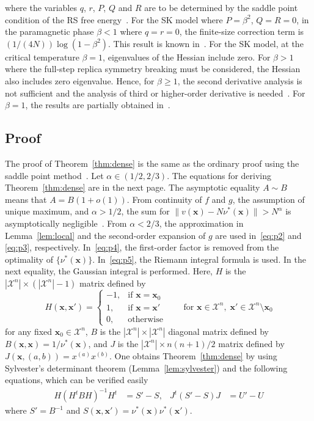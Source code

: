 \documentclass[conference,twocolumns]{IEEEtran}
\theoremstyle{plain}
\begin{document}
where the variables $q$, $r$, $P$, $Q$ and $R$ are to be determined by the saddle point condition of the RS free energy~\cite{mezard2009ipa}.
For the SK model where $P=\beta^2$, $Q=R=0$, in the paramagnetic phase $\beta<1$ where $q=r=0$, the finite-size correction term is
$(1/(4N))\log\left(1-\beta^2\right)$.
This result is known in~\cite{parisi1993critical}.
For the SK model, at the critical temperature $\beta=1$, eigenvalues of the Hessian include zero.
For $\beta > 1$ where the full-step replica symmetry breaking must be considered, the Hessian also includes zero eigenvalue. 
Hence, for $\beta\ge 1$, the second derivative analysis is not sufficient and the analysis of third or higher-order derivative is needed~\cite{flajolet2009analytic}.
For $\beta= 1$, the results are partially obtained in~\cite{parisi1993critical}.

\subsection{Proof}
The proof of Theorem~\ref{thm:dense} is the same as the ordinary proof using the saddle point method~\cite{flajolet2009analytic}.
Let $\alpha\in(1/2,2/3)$.
The equations for deriving Theorem~\ref{thm:dense} are in the next page.
The asymptotic equality $A\sim B$ means that $A=B(1+o(1))$.
From continuity of $f$ and $g$, the assumption of unique maximum, and $\alpha>1/2$, the sum for $\|v(\bm{x})-N\nu^*(\bm{x})\|>N^\alpha$
is asymptotically negligible~\cite{flajolet2009analytic}.
From $\alpha<2/3$, the approximation in Lemma~\ref{lem:local} and
the second-order expansion of $g$ are used
in~\eqref{eq:p2} and \eqref{eq:p3}, respectively.
In~\eqref{eq:p4}, the first-order factor is removed from the optimality of $\{\nu^*(\bm{x})\}$.
In~\eqref{eq:p5}, the Riemann integral formula is used.
In the next equality, the Gaussian integral is performed.
Here, $H$ is the $|\mathcal{X}^n|\times(|\mathcal{X}^n|-1)$ matrix defined by
\begin{equation*}
H(\bm{x},\bm{x}')=\begin{cases}
-1,& \text{if } \bm{x}=\bm{x}_0\\
1,& \text{if } \bm{x}=\bm{x}'\\
0,& \text{otherwise}
\end{cases}
\hspace{2em} \text{for } \bm{x}\in\mathcal{X}^n,\; \bm{x}'\in\mathcal{X}^n\setminus \bm{x}_0
\end{equation*}
for any fixed $\bm{x}_0\in\mathcal{X}^n$, 
$B$ is the $|\mathcal{X}^n|\times|\mathcal{X}^n|$ diagonal matrix defined by $B(\bm{x},\bm{x})=1/\nu^*(\bm{x})$, 
and $J$ is the $|\mathcal{X}^n|\times n(n+1)/2$ matrix defined by $J(\bm{x},(a,b))= x^{(a)}x^{(b)}$.
One obtains Theorem~\ref{thm:dense}
by using Sylvester's determinant theorem (Lemma~\ref{lem:sylvester}) 
and the following equations, which can be verified easily
\begin{align*}
H(H^tBH)^{-1}H^t &= S' - S, &
J^t(S'-S)J&= U' - U
\end{align*}
where $S'=B^{-1}$ and
$S(\bm{x},\bm{x}')=\nu^*(\bm{x})\nu^*(\bm{x}')$.
\end{document}
